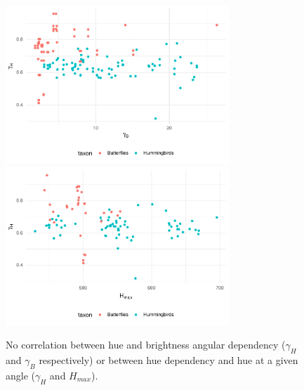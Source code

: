 \documentclass[a4]{article}
\begin{document}
    \begin{figure}[!h]
        \centering
        \includegraphics[width=0.75\textwidth]{cor_gammaB_gammaH}
        \includegraphics[width=0.75\textwidth]{cor_Hmax_gammaH}
        \caption{No correlation between hue and brightness angular dependency ($\gamma_{H}$ and $\gamma_{B}$ respectively) or between hue dependency and hue at a given angle ($\gamma_{H}$ and $H_{max}$).}
    \end{figure}
    
\end{document}
